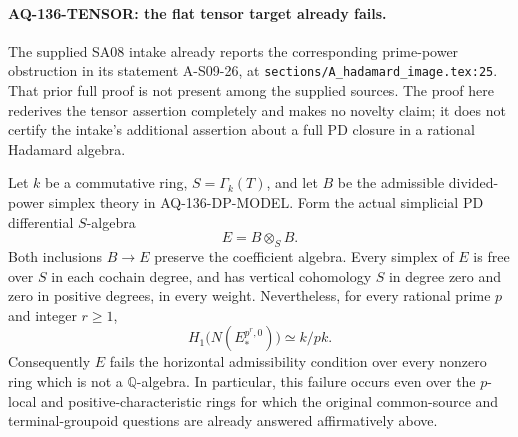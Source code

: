 \paragraph{AQ-136-TENSOR: the flat tensor target already fails.}
The supplied SA08 intake already reports the corresponding
prime-power obstruction in its statement A-S09-26, at
\texttt{sections/A\_hadamard\_image.tex:25}. That prior full
proof is not present among the supplied sources. The proof here
rederives the tensor assertion completely and makes no novelty
claim; it does not certify the intake's additional assertion
about a full PD closure in a rational Hadamard algebra.

Let $k$ be a commutative ring, $S=\Gamma_k(T)$, and let $B$ be
the admissible divided-power simplex theory in AQ-136-DP-MODEL.
Form the actual simplicial PD differential $S$-algebra
\[
                         E=B\otimes_S B.
\]
Both inclusions $B\to E$ preserve the coefficient algebra.
Every simplex of $E$ is free over $S$ in each cochain degree,
and has vertical cohomology $S$ in degree zero and zero in
positive degrees, in every weight. Nevertheless, for every
rational prime $p$ and integer $r\geq1$,
\[
 H_1\bigl(N(E^{p^r,0}_*)\bigr)\simeq k/pk.                 \tag{136.T1}
\]
Consequently $E$ fails the horizontal admissibility condition
over every nonzero ring which is not a $\mathbb Q$-algebra.
In particular, this failure occurs even over the $p$-local
and positive-characteristic rings for which the original
common-source and terminal-groupoid questions are already
answered affirmatively above.


